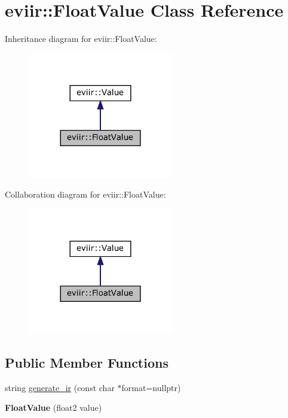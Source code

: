 \hypertarget{classeviir_1_1FloatValue}{}\section{eviir\+:\+:Float\+Value Class Reference}
\label{classeviir_1_1FloatValue}


Inheritance diagram for eviir\+:\+:Float\+Value\+:\nopagebreak
\begin{figure}[H]
\begin{center}
\leavevmode
\includegraphics[width=180pt]{classeviir_1_1FloatValue__inherit__graph}
\end{center}
\end{figure}


Collaboration diagram for eviir\+:\+:Float\+Value\+:\nopagebreak
\begin{figure}[H]
\begin{center}
\leavevmode
\includegraphics[width=180pt]{classeviir_1_1FloatValue__coll__graph}
\end{center}
\end{figure}
\subsection*{Public Member Functions}
\begin{DoxyCompactItemize}
\item 
string \hyperlink{classeviir_1_1FloatValue_a8713d6eb43445ba56c4104bce8fe7070}{generate\+\_\+ir} (const char $\ast$format=nullptr)
\item 
\mbox{\label{classeviir_1_1FloatValue_a0ef754397965b49c1c547f476ae64bec}} 
{\bfseries Float\+Value} (float2 value)
\end{DoxyCompactItemize}

